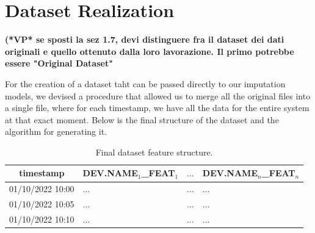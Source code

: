 \section{Dataset Realization}
 {\bf (*VP* se sposti la sez 1.7, devi distinguere fra il dataset dei dati originali e quello ottenuto dalla loro lavorazione. Il primo potrebbe essere "Original Dataset"}

For the creation of a dataset taht can be passed directly to our imputation models, we devised a procedure that
allowed us to merge all the original files into a single file, where for
each timestamp, we have all the data for the entire system at
that exact moment. Below is the final structure of the dataset
and the algorithm for generating it.



\begin{table}[H]
	\begin{center}
		\begin{tabular}[c]{l|l|l|l}
			\hline
			\multicolumn{1}{c|}{\textbf{timestamp}}              &
			\multicolumn{1}{c|}{\textbf{DEV.NAME$_1$\_FEAT$_1$}} &
			\multicolumn{1}{c|}{$\ldots$}                        &
			\multicolumn{1}{c}{\textbf{DEV.NAME$_n$\_FEAT$_n$}}                                   \\
			\hline

			01/10/2022 10:00                                     & $\ldots$ & $\ldots$ & $\ldots$ \\
			01/10/2022 10:05                                     & $\ldots$ & $\ldots$ & $\ldots$ \\
			01/10/2022 10:10                                     & $\ldots$ & $\ldots$ & $\ldots$ \\
			\hline
		\end{tabular}
	\end{center}
	\caption{Final dataset feature structure.}\label{tab:datasetform}
\end{table}

